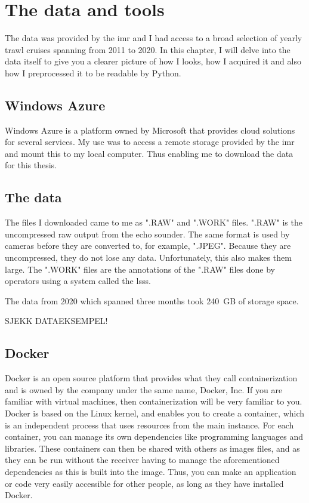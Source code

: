 \chapter{The data and tools}
    The data was provided by the \gls{imr} and I had access to a broad selection of yearly trawl cruises spanning from 2011 to 2020. In this chapter, I will delve into the data itself to give you a clearer picture of how I looks, how I acquired it and also how I preprocessed it to be readable by Python.
    
    \section{Windows Azure}
        Windows Azure\cite{azure} is a platform owned by Microsoft that provides cloud solutions for several services. My use was to access a remote storage provided by the \gls{imr} and mount this to my local computer. Thus enabling me to download the data for this thesis. 
    
    \section{The data}
        The files I downloaded came to me as ".RAW" \cite{raw} and ".WORK" files. ".RAW" is the uncompressed raw output from the echo sounder. The same format is used by cameras before they are converted to, for example, ".JPEG". Because they are uncompressed, they do not lose any data. Unfortunately, this also makes them large. The ".WORK" files are the annotations of the ".RAW" files done by operators using a system called the \Gls{lsss}\cite{lsss}. 
        
        The data from 2020 which spanned three months took 240 GB of storage space. 
        
        SJEKK DATAEKSEMPEL!

    \section{Docker}
        Docker\cite{docker} is an open source platform that provides what they call containerization and is owned by the company under the same name, Docker, Inc. If you are familiar with virtual machines, then containerization will be very familiar to you. Docker is based on the Linux kernel, and enables you to create a container, which is an independent process that uses resources from the main instance. For each container, you can manage its own dependencies like programming languages and libraries. These containers can then be shared with others as images files, and as they can be run without the receiver having to manage the aforementioned dependencies as this is built into the image. Thus, you can make an application or code very easily accessible for other people, as long as they have installed Docker.
        
